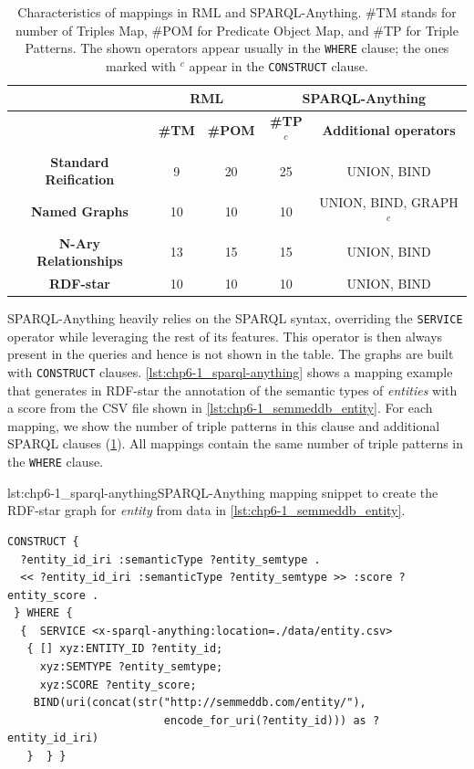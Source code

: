 \begin{table}[t!]
    \caption[Characteristics of evaluation mapping]{Characteristics of mappings in RML and SPARQL-Anything. \#TM stands for number of Triples Map, \#POM for Predicate Object Map, and \#TP for Triple Patterns. The shown operators appear usually in the \texttt{WHERE} clause; the ones marked with $^c$ appear in the \texttt{CONSTRUCT} clause. }
    \label{tab:chp6-1_mapping-char}
    \centering
    \begin{tabular}{ccc|cc}
        \cmidrule{2-5}
         & \multicolumn{2}{c|}{\textbf{RML}} & \multicolumn{2}{c}{\textbf{SPARQL-Anything}}  \\ \midrule
         & \textbf{\#TM} & \textbf{\#POM} & \textbf{\#TP$^c$} & \textbf{Additional operators}  \\ \midrule
         \textbf{Standard Reification} & 9 & 20 & 25 & UNION, BIND  \\ \midrule
         \textbf{Named Graphs} & 10 & 10 & 10 & UNION, BIND, GRAPH$^c$  \\ \midrule
         \textbf{N-Ary Relationships} & 13 & 15 & 15 & UNION, BIND  \\ \midrule
         \textbf{RDF-star} & 10 & 10 & 10 & UNION, BIND  \\  \midrule
         
    \end{tabular}
\end{table}

SPARQL-Anything heavily relies on the SPARQL syntax, overriding the \texttt{SERVICE} operator while leveraging the rest of its features. This operator is then always present in the queries and hence is not shown in the table. The graphs are built with \texttt{CONSTRUCT} clauses. \cref{lst:chp6-1_sparql-anything} shows a mapping example that generates in RDF-star the annotation of the semantic types of \textit{entities} with a score from the CSV file shown in \cref{lst:chp6-1_semmeddb_entity}.
For each mapping, we show the number of triple patterns in this clause and additional SPARQL clauses (\cref{tab:chp6-1_mapping-char}). All mappings contain the same number of triple patterns in the \texttt{WHERE} clause.




\noindent\begin{captionedlisting}{lst:chp6-1_sparql-anything}{SPARQL-Anything mapping snippet to create the RDF-star graph for \textit{entity} from data in \cref{lst:chp6-1_semmeddb_entity}.  }
\centering
{
\begin{lstlisting}[basicstyle=\ttfamily\small,label={list:example1},columns=flexible,language=sparql]
CONSTRUCT {
  ?entity_id_iri :semanticType ?entity_semtype .
  << ?entity_id_iri :semanticType ?entity_semtype >> :score ?entity_score .
 } WHERE {
  {  SERVICE <x-sparql-anything:location=./data/entity.csv>
   { [] xyz:ENTITY_ID ?entity_id;
     xyz:SEMTYPE ?entity_semtype;
     xyz:SCORE ?entity_score;
    BIND(uri(concat(str("http://semmeddb.com/entity/"),
                        encode_for_uri(?entity_id))) as ?entity_id_iri)
   }  } }

\end{lstlisting}
}
\end{captionedlisting}




